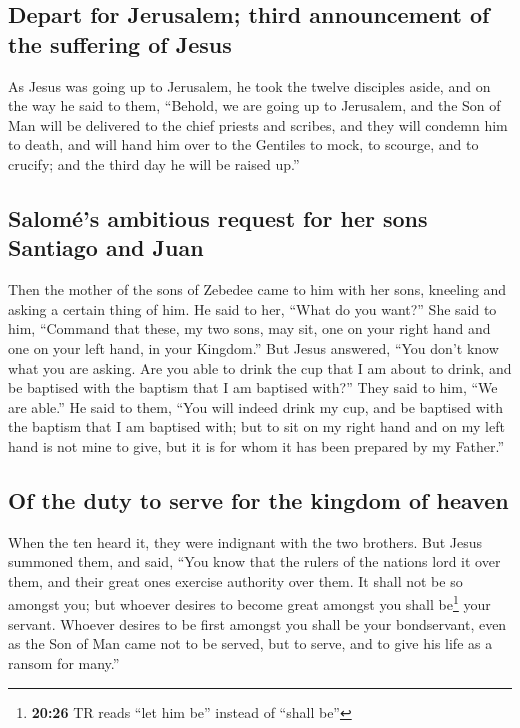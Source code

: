\hypertarget{depart-for-jerusalem-third-announcement-of-the-suffering-of-jesus}{%
\subsection{Depart for Jerusalem; third announcement of the suffering of
Jesus}\label{depart-for-jerusalem-third-announcement-of-the-suffering-of-jesus}}

 As Jesus was going up to Jerusalem, he took the twelve
disciples aside, and on the way he said to them, 
``Behold, we are going up to Jerusalem, and the Son of Man will be
delivered to the chief priests and scribes, and they will condemn him to
death,  and will hand him over to the Gentiles to mock,
to scourge, and to crucify; and the third day he will be raised up.''

\hypertarget{salomuxe9s-ambitious-request-for-her-sons-santiago-and-juan}{%
\subsection{Salomé's ambitious request for her sons Santiago and
Juan}\label{salomuxe9s-ambitious-request-for-her-sons-santiago-and-juan}}

 Then the mother of the sons of Zebedee came to him with
her sons, kneeling and asking a certain thing of him.  He
said to her, ``What do you want?'' She said to him, ``Command that
these, my two sons, may sit, one on your right hand and one on your left
hand, in your Kingdom.''  But Jesus answered, ``You don't
know what you are asking. Are you able to drink the cup that I am about
to drink, and be baptised with the baptism that I am baptised with?''
They said to him, ``We are able.''  He said to them,
``You will indeed drink my cup, and be baptised with the baptism that I
am baptised with; but to sit on my right hand and on my left hand is not
mine to give, but it is for whom it has been prepared by my Father.''

\hypertarget{of-the-duty-to-serve-for-the-kingdom-of-heaven}{%
\subsection{Of the duty to serve for the kingdom of
heaven}\label{of-the-duty-to-serve-for-the-kingdom-of-heaven}}

 When the ten heard it, they were indignant with the two
brothers.  But Jesus summoned them, and said, ``You know
that the rulers of the nations lord it over them, and their great ones
exercise authority over them.  It shall not be so amongst
you; but whoever desires to become great amongst you shall be\footnote{\textbf{20:26}
  TR reads ``let him be'' instead of ``shall be''} your servant.
 Whoever desires to be first amongst you shall be your
bondservant,  even as the Son of Man came not to be
served, but to serve, and to give his life as a ransom for many.''

